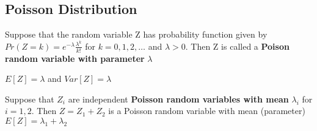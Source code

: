 \documentclass[12pt]{article}
\begin{document}
\begin{spacing}{2.0}
\subsection{Poisson Distribution}

Suppose that the random variable Z has probability function given by $Pr(Z=k)= e^{-\lambda} \frac{\lambda^k}{k!}$ for $k=0,1,2,\ldots$ and $\lambda>0$. Then Z is called a \textbf{Poison random variable with parameter} $\lambda$

$E[Z]= \lambda$ and $Var[Z]=\lambda$

Suppose that $Z_i$ are independent \textbf{Poisson random variables with mean} $\lambda_i$ for $i=1,2$. Then $Z=Z_1+Z_2$ is a Poisson random variable with mean (parameter) $E[Z]= \lambda_1+\lambda_2$

\end{spacing}
\end{document}
